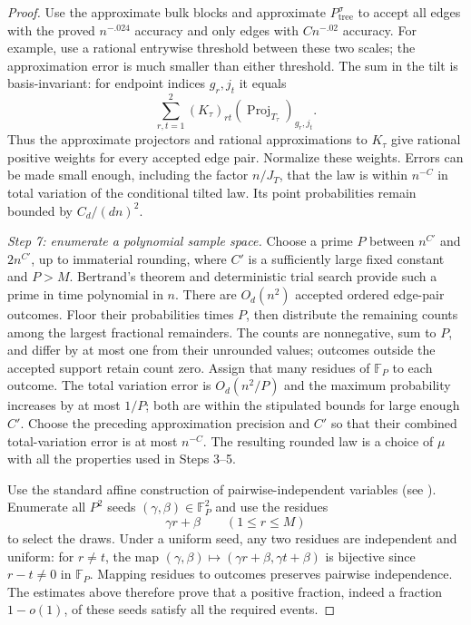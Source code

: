 \begin{proof}
Use the approximate bulk blocks and approximate
$P_{\mathrm{tree}}^\sigma$ to accept all edges with the proved
$n^{-.024}$ accuracy and only edges with $Cn^{-.02}$ accuracy.  For example,
use a rational entrywise threshold between these two scales; the approximation
error is much smaller than either threshold.  The sum in the tilt is
basis-invariant: for endpoint indices $g_r,j_t$ it equals
\[
 \sum_{r,t=1}^2(K_\tau)_{rt}
       (\operatorname{Proj}_{T_\tau})_{g_r,j_t}.
\]
Thus the approximate projectors and rational approximations to $K_\tau$
give rational positive weights for every accepted edge pair.  Normalize these
weights.  Errors can be made small enough, including the factor $n/J_T$, that
the law is within $n^{-C}$ in total variation of the conditional tilted law.
Its point probabilities remain bounded by $C_d/(dn)^2$.

\par\smallskip\noindent\textit{Step 7: enumerate a polynomial sample space.}\quad
Choose a prime $P$ between $n^{C'}$ and $2n^{C'}$, up to immaterial rounding,
where $C'$ is a sufficiently large fixed constant and $P>M$.
Bertrand's theorem and deterministic trial search provide such a prime in
time polynomial in $n$.
There are $O_d(n^2)$ accepted ordered edge-pair outcomes.  Floor their
probabilities times $P$, then distribute the remaining counts among the
largest fractional remainders.  The counts are nonnegative, sum to $P$,
and differ by at most one from their unrounded values; outcomes outside
the accepted support retain count zero.  Assign that many residues
of $\mathbb F_P$ to each outcome.  The total variation error is
$O_d(n^2/P)$ and the maximum probability increases by at most $1/P$; both are
within the stipulated bounds for large enough $C'$.
Choose the preceding approximation precision and $C'$ so that their combined
total-variation error is at most $n^{-C}$.  The resulting rounded law is a
choice of $\mu$ with all the properties used in Steps 3--5.

Use the standard affine construction of pairwise-independent variables
(see \cite[Section~2.2]{PR2008}).  Enumerate all $P^2$ seeds
$(\gamma,\beta)\in\mathbb F_P^2$ and use the residues
\[
 \gamma r+\beta\qquad(1\le r\le M)
\]
to select the draws.  Under a uniform seed, any two residues are independent
and uniform: for $r\ne t$, the map
$(\gamma,\beta)\mapsto(\gamma r+\beta,\gamma t+\beta)$ is bijective since
$r-t\ne0$ in $\mathbb F_P$.  Mapping residues to outcomes preserves pairwise
independence.  The estimates above therefore prove that a positive fraction,
indeed a fraction $1-o(1)$, of these seeds satisfy all the required events.


\end{proof}
